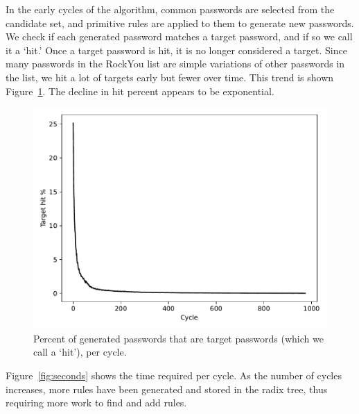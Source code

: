 \documentclass[letterpaper,twocolumn,10pt]{article}
\begin{document}
In the early cycles of the algorithm, common passwords are selected from the
candidate set, and primitive rules are applied to them to generate new
passwords. We check if each generated password matches a target password, and
if so we call it a `hit.' Once a target password is hit, it is no longer
considered a target. Since many passwords in the RockYou list are simple
variations of other passwords in the list, we hit a lot of targets early but
fewer over time. This trend is shown Figure~\ref{fig:hitpct}. The decline in
hit percent appears to be exponential.

\begin{figure}[h]
\includegraphics[width=\linewidth]
{analysis/passwords-analysis/stats-hitpct.pdf}
\caption{Percent of generated passwords that are target passwords (which we
call a `hit'), per cycle.}
\label{fig:hitpct}
\end{figure}

Figure~\ref{fig:seconds} shows the time required per cycle. As the number of
cycles increases, more rules have been generated and stored in the radix tree,
thus requiring more work to find and add rules.
\end{document}
